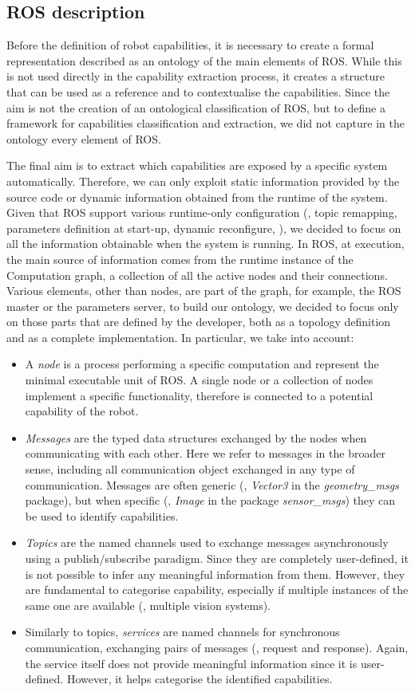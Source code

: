 \subsection{ROS description}
\label{sec:ros-desc}
Before the definition of robot capabilities, it is necessary to create a formal representation described as an ontology of the main elements of ROS. While this is not used directly in the capability extraction process, it creates a structure that can be used as a reference and to contextualise the capabilities. Since the aim is not the creation of an ontological classification of ROS, but to define a framework for capabilities classification and extraction, we did not capture in the ontology every element of ROS. 

The final aim is to extract which capabilities are exposed by a specific system automatically. Therefore, we can only exploit static information provided by the source code or dynamic information obtained from the runtime of the system. Given that ROS support various runtime-only configuration (\eg, topic remapping, parameters definition at start-up, dynamic reconfigure, \etc), we decided to focus on all the information obtainable when the system is running. In ROS, at execution, the main source of information comes from the runtime instance of the Computation graph, a collection of all the active nodes and their connections. Various elements, other than nodes, are part of the graph, for example, the ROS master or the parameters server, to build our ontology, we decided to focus only on those parts that are defined by the developer, both as a topology definition and as a complete implementation. In particular, we take into account:
\begin{itemize}
\item A \textit{node} is a process performing a specific computation and represent the minimal executable unit of ROS. A single node or a collection of nodes implement a specific functionality, therefore is connected to a potential capability of the robot.
\item \textit{Messages} are the typed data structures exchanged by the nodes when communicating with each other. Here we refer to messages in the broader sense, including all communication object exchanged in any type of communication. Messages are often generic (\eg, \textit{Vector3} in the \textit{geometry\_msgs} package), but when specific (\eg, \textit{Image} in the package \textit{sensor\_msgs})  they can be used to identify capabilities.
\item \textit{Topics} are the named channels used to exchange messages asynchronously using a publish/subscribe paradigm. Since they are completely user-defined, it is not possible to infer any meaningful information from them. However, they are fundamental to categorise capability, especially if multiple instances of the same one are available (\eg, multiple vision systems).
\item Similarly to topics, \textit{services} are named channels for synchronous communication, exchanging pairs of messages (\ie, request and response). Again, the service itself does not provide meaningful information since it is user-defined. However, it helps categorise the identified capabilities.  
\end{itemize}
